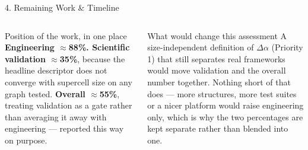 \documentclass[aspectratio=169, 11pt]{beamer}
\begin{document}
\begin{frame}{4. Remaining Work \& Timeline}
\begin{columns}[T]
\begin{block}{\footnotesize Position of the work, in one place}
\vspace{0.08cm}
\textbf{Engineering $\approx$88\%. Scientific validation $\approx$35\%}, because the
headline descriptor does not converge with supercell size on any graph tested.
\textbf{Overall $\approx$55\%}, treating validation as a gate rather than averaging it away
with engineering --- reported this way on purpose.
\end{block}
\begin{block}{\footnotesize What would change this assessment}
\scriptsize
A size-independent definition of $\Delta\alpha$ (Priority 1) that still separates real
frameworks would move validation and the overall number together. Nothing short of that
does --- more structures, more test suites or a nicer platform would raise engineering
only, which is why the two percentages are kept separate rather than blended into one.
\end{block}
\end{columns}
\end{frame}

\end{document}
